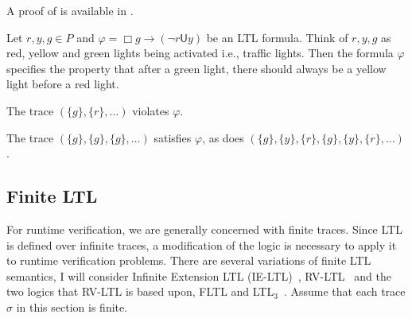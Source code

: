 \documentclass[a4paper]{article}
\newcommand{\U}{\mathsf{U}}
\begin{document}
A proof of  is available in \textcite[249]{baier2008principles}.

\begin{eg}\label{ltleg}
  Let $r,y,g\in P$ and $\varphi = \Box g \to (\neg r \U y)$ be an LTL formula. Think of $r,y,g$ as red, yellow and green lights being activated i.e., traffic lights. Then the formula $\varphi$ specifies the property that after a green light, there should always be a yellow light before a red light.

  The trace $(\{g\},\{r\},\dots)$ violates $\varphi$.

  The trace $(\{g\},\{g\},\{g\},\dots)$ satisfies $\varphi$, as does $(\{g\},\{y\},\{r\},\{g\},\{y\},\{r\},\dots)$.
\end{eg}


\subsection{Finite LTL}
For runtime verification, we are generally concerned with finite traces. Since LTL is defined over infinite traces, a modification of the logic is necessary to apply it to runtime verification problems.
There are several variations of finite LTL semantics, I will consider Infinite Extension LTL (IE-LTL)~\autocite{rosu2005rewriting}, RV-LTL~\autocite{bauer2010comparing} and the two logics that RV-LTL is based upon, FLTL and LTL$_3$~\autocite{bauer2010comparing}.
Assume that each trace $\sigma$ in this section is finite.
\end{document}
